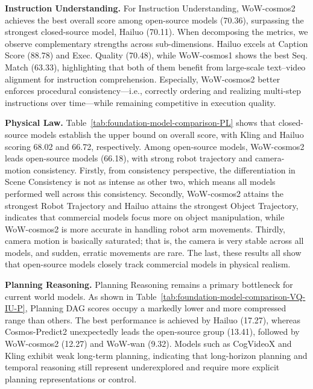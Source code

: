 \textbf{Instruction Understanding.} For Instruction Understanding, WoW-cosmos2 achieves the best overall score among open-source models (70.36), surpassing the strongest closed-source model, Hailuo (70.11). When decomposing the metrics, we observe complementary strengths across sub-dimensions. Hailuo excels at Caption Score (88.78) and Exec. Quality (70.48), while WoW-cosmos1 shows the best Seq. Match (63.33), highlighting that both of them benefit from large-scale text–video alignment for instruction comprehension. Especially, WoW-cosmos2 better enforces procedural consistency—i.e., correctly ordering and realizing multi-step instructions over time—while remaining competitive in execution quality.

\textbf{Physical Law.} Table~\ref{tab:foundation-model-comparison-PL} shows that closed-source models establish the upper bound on overall score, with Kling and Hailuo scoring 68.02 and 66.72, respectively. Among open-source models, WoW-cosmos2 leads open-source models (66.18), with strong robot trajectory and camera-motion consistency. Firstly, from consistency perspective, the differentiation in Scene Consistency is not as intense as other two, which means all models performed well across this consistency. Secondly, WoW-cosmos2 attains the strongest Robot Trajectory and Hailuo attains the strongest Object Trajectory, indicates that commercial models focus more on object manipulation, while WoW-cosmos2 is more accurate in handling robot arm movements. Thirdly, camera motion is basically saturated; that is, the camera is very stable across all models, and sudden, erratic movements are rare. The last, these results all show that open-source models closely track commercial models in physical realism.

\textbf{Planning Reasoning.} Planning Reasoning remains a primary bottleneck for current world models. As shown in Table~\ref{tab:foundation-model-comparison-VQ-IU-P}, Planning DAG scores occupy a markedly lower and more compressed range than others. The best performance is achieved by Hailuo (17.27), whereas Cosmos-Predict2 unexpectedly leads the open-source group (13.41), followed by WoW-cosmos2 (12.27) and WoW-wan (9.32). Models such as CogVideoX and Kling exhibit weak long-term planning, indicating that long-horizon planning and temporal reasoning still represent underexplored and require more explicit planning representations or control.


